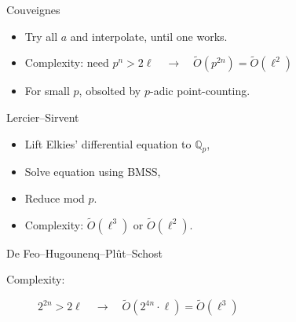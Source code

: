 \documentclass[12pt,aspectratio=169]{beamer}
\newcommand{\sm}[2]{\left(\protect\begin{matrix}#1\protect\\#2\protect\end{matrix}\right)}
\begin{document}

\begin{frame}{Couveignes}
  \large\centering

  \bigskip
  \begin{itemize}
  \item Try all $a$ and interpolate, until one works.
  \item Complexity: need $p^n > 2\ell \quad\to\quad \tilde{O}(p^{2n}) = \tilde{O}(\ell^2)$
  \item For small $p$, obsolted by $p$-adic point-counting.
  \end{itemize}
\end{frame}


\begin{frame}{Lercier--Sirvent}
  \large
  \begin{itemize}
  \item Lift Elkies' differential equation to $\mathbb{Q}_p$,
  \item Solve equation using BMSS,
  \item Reduce mod $p$.
  \item Complexity: $\tilde{O}(\ell^3)$ or $\tilde{O}(\ell^2)$.
  \end{itemize}
\end{frame}


\begin{frame}{De Feo--Hugounenq--Plût--Schost} 
  \large\centering

  \bigskip
  \begin{description}
  \item[Complexity:] $2^{2n} > 2\ell \quad\to\quad \tilde{O}(2^{4n}\cdot\ell) = \tilde{O}(\ell^{3})$
  \end{description}
\end{frame}
\end{document}
